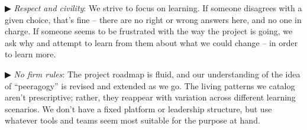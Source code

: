 \begin{mdframed}
▶ \emph{Respect and civility}: We strive to focus on learning.  If
someone disagrees with a given choice, that's fine -- there are no
right or wrong answers here, and no one in charge.  If someone seems
to be frustrated with the way the project is going, we ask why and
attempt to learn from them about what we could change -- in order to
learn more.

▶ \emph{No firm rules}: The project roadmap is fluid, and our
understanding of the idea of ``peeragogy'' is revised and extended as
we go.  The living patterns we catalog aren't prescriptive; rather,
they reappear with variation across different learning scenarios.  We
don't have a fixed platform or leadership structure, but use whatever
tools and teams seem most suitable for the purpose at hand.
\end{mdframed}
